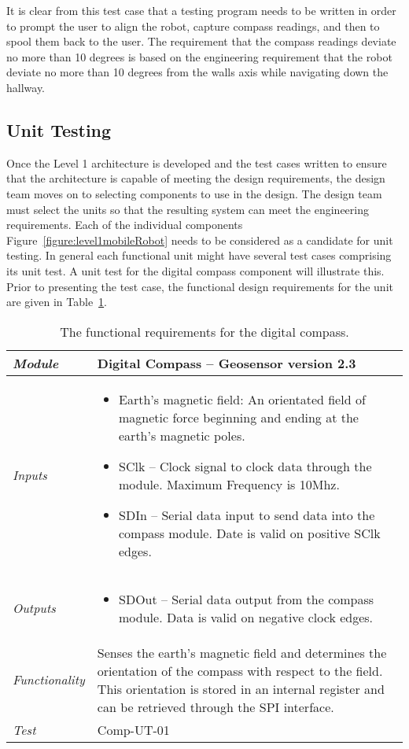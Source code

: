 It is clear from this test case that a testing program needs to be
written in order to prompt the user to align the robot, capture compass
readings, and then to spool them back to the user. The requirement that
the compass readings deviate no more than 10 degrees is based on the
engineering requirement that the robot deviate no more than 10 degrees
from the walls axis while navigating down the hallway.

\subsection*{Unit Testing}
\label{subsection:unit-testing-1}


Once the Level 1 architecture is developed and the test cases written to
ensure that the architecture is capable of meeting the design
requirements, the design team moves on to selecting components to use in
the design. The design team must select the units so that the resulting
system can meet the engineering requirements. Each of the individual
components Figure~\ref{figure:level1mobileRobot}
needs to be considered as a candidate for unit
testing. In general each functional unit might have several test cases
comprising its unit test. A unit test for the digital compass component
will illustrate this. Prior to presenting the test case, the functional
design requirements for the unit are given in 
Table~\ref{table:functionalDigitalCompass}.


\begin{table}
\caption{The functional requirements for the digital compass.}
\label{table:functionalDigitalCompass}
\begin{tabular}{|l|m{10cm}|}
\hline
\emph{Module} & Digital Compass -- Geosensor version 2.3 \\ \hline
\emph{Inputs} & 
\begin{itemize}
\item
  Earth's magnetic field: An orientated field of magnetic force
  beginning and ending at the earth's magnetic poles.
\item
  SClk -- Clock signal to clock data through the module. Maximum
  Frequency is 10Mhz.
\item
  SDIn -- Serial data input to send data into the compass module. Date
  is valid on positive SClk edges.
\end{itemize}\\ \hline
\emph{Outputs} & 
\begin{itemize}
\item
  SDOut -- Serial data output from the compass module. Data is valid on
  negative clock edges.
\end{itemize}\\ \hline
\emph{Functionality} & Senses the earth's magnetic field and determines
the orientation of the compass with respect to the field. This
orientation is stored in an internal register and can be retrieved
through the SPI interface. \\ \hline
\emph{Test} & Comp-UT-01 \\  \hline
\end{tabular}
\end{table}

